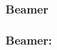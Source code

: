 \begin{frame}[fragile]
\frametitle{Beamer}

\end{frame}


\begin{frame}[fragile]
\frametitle{Beamer: }
    
\end{frame}